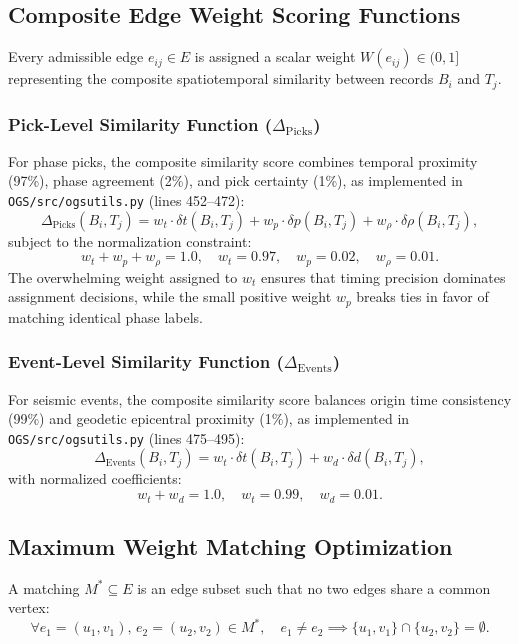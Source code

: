 \subsection{Composite Edge Weight Scoring Functions}
Every admissible edge $e_{ij} \in E$ is assigned a scalar weight $W(e_{ij}) \in (0, 1]$ representing the composite spatiotemporal similarity between records $B_i$ and $T_j$.

\subsubsection{Pick-Level Similarity Function ($\Delta_{\mathrm{Picks}}$)}
For phase picks, the composite similarity score combines temporal proximity (97\%), phase agreement (2\%), and pick certainty (1\%), as implemented in \texttt{OGS/src/ogsutils.py} (lines 452--472):
\begin{equation}
  \Delta_{\mathrm{Picks}}(B_i, T_j) = w_t \cdot \delta t(B_i, T_j) + w_p \cdot \delta p(B_i, T_j) + w_\rho \cdot \delta \rho(B_i, T_j),
\end{equation}
subject to the normalization constraint:
\begin{equation}
  w_t + w_p + w_\rho = 1.0, \quad w_t = 0.97, \quad w_p = 0.02, \quad w_\rho = 0.01.
\end{equation}
The overwhelming weight assigned to $w_t$ ensures that timing precision dominates assignment decisions, while the small positive weight $w_p$ breaks ties in favor of matching identical phase labels.

\subsubsection{Event-Level Similarity Function ($\Delta_{\mathrm{Events}}$)}
For seismic events, the composite similarity score balances origin time consistency (99\%) and geodetic epicentral proximity (1\%), as implemented in \texttt{OGS/src/ogsutils.py} (lines 475--495):
\begin{equation}
  \Delta_{\mathrm{Events}}(B_i, T_j) = w_t \cdot \delta t(B_i, T_j) + w_d \cdot \delta d(B_i, T_j),
\end{equation}
with normalized coefficients:
\begin{equation}
  w_t + w_d = 1.0, \quad w_t = 0.99, \quad w_d = 0.01.
\end{equation}

\subsection{Maximum Weight Matching Optimization}
A matching $M^* \subseteq E$ is an edge subset such that no two edges share a common vertex:
\begin{equation}
  \forall e_1 = (u_1, v_1), \, e_2 = (u_2, v_2) \in M^*, \quad e_1 \neq e_2 \implies \{u_1, v_1\} \cap \{u_2, v_2\} = \emptyset.
\end{equation}

